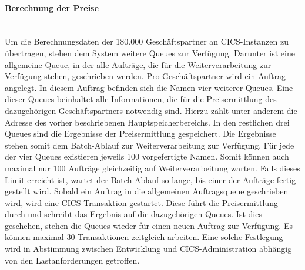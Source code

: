 \paragraph{Berechnung der Preise}~\\
Um die Berechnungsdaten der 180.000 Geschäftspartner an CICS-Instanzen zu übertragen, stehen dem System weitere Queues zur Verfügung.
Darunter ist eine allgemeine Queue, in der alle Aufträge, die für die Weiterverarbeitung zur Verfügung stehen, geschrieben werden.
Pro Geschäftspartner wird ein Auftrag angelegt.
In diesem Auftrag befinden sich die Namen vier weiterer Queues.
Eine dieser Queues beinhaltet alle Informationen, die für die Preisermittlung des dazugehörigen Geschäftspartners notwendig sind.
Hierzu zählt unter anderem die Adresse des vorher beschriebenen Hauptspeicherbereichs.
In den restlichen drei Queues sind die Ergebnisse der Preisermittlung gespeichert.
Die Ergebnisse stehen somit dem Batch-Ablauf zur Weiterverarbeitung zur Verfügung.
Für jede der vier Queues existieren jeweils 100 vorgefertigte Namen.
Somit können auch maximal nur 100 Aufträge gleichzeitig auf Weiterverarbeitung warten.
Falls dieses Limit erreicht ist, wartet der Batch-Ablauf so lange, bis einer der Aufträge fertig gestellt wird.
Sobald ein Auftrag in die allgemeinen Auftragsqueue geschrieben wird, wird eine CICS-Transaktion gestartet.
Diese führt die Preisermittlung durch und schreibt das Ergebnis auf die dazugehörigen Queues.
Ist dies geschehen, stehen die Queues wieder für einen neuen Auftrag zur Verfügung.
Es können maximal 30 Transaktionen zeitgleich arbeiten.
Eine solche Festlegung wird in Abstimmung zwischen Entwicklung und CICS-Administration abhängig von den Lastanforderungen getroffen.
